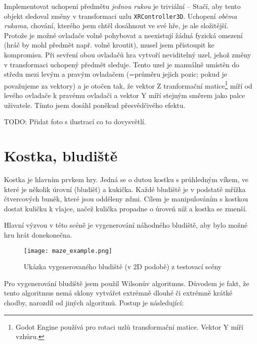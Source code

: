 Implementovat uchopení předmětu \textit{jednou rukou} je triviální -- Stačí, aby tento objekt sledoval změny v transformaci uzlu \texttt{XRController3D}. Uchopení \textit{oběma rukama}, chování, kterého jsem chtěl dosáhnout ve své hře, je ale složitější. Protože je možné ovladače volně pohybovat a neexistují žádná fyzická omezení (hráč by mohl předmět např. volně kroutit), musel jsem přistoupit ke kompromisu. Při sevření obou ovladačů hra vytvoří neviditelný uzel, jehož změny v transformaci uchopený předmět sleduje. Tento uzel je manuálně umístěn do středu mezi levým a pravým ovladačem (=průměru jejich pozic; pokud je považujeme za vektory) a je otočen tak, že vektor Z tranformační matice\footnote{Godot Engine používá pro rotaci uzlů transformační matice. Vektor Y míří vzhůru.} míří od levého ovladače k pravému ovladači a vektor Y míří stejným směrem jako palce uživatele. Tímto jsem dosáhl poněkud přesvědčivého efektu.

TODO: Přidat foto s ilustrací co to dovysvětlí.

\section{Kostka, bludiště}

Kostka je hlavním prvkem hry. Jedná se o dutou kostku s průhledným víkem, ve které je několik úrovní (bludišť) a kukička. Každé bludiště je v podstatě mřížka čtvercových buněk, které jsou odděleny zdmi. Cílem je manipulováním s kostkou dostat kuličku k vlajce, načež kulička propadne o úroveň níž a kostka se zmenší.

Hlavní výzvou v této scéně je vygenerování náhodného bludiště, aby bylo možné hru hrát donekonečna.

\begin{figure}[H]
  \centering
  \texttt{[image: maze\_example.png]}
  \caption{Ukázka vygenerovaného bludiště (v 2D podobě) z testovací scény}
  \label{maze_example}
\end{figure}

Pro vygenerování bludiště jsem použil Wilsonův algoritmus. Důvodem je fakt, že tento algoritmus nemá sklony vytvářet extrémně dlouhé či extrémně krátké chodby, narozdíl od jiných algoritmů. Postup je následující: \cite{enwiki:1193338583}


